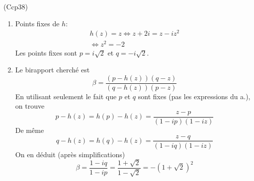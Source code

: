\begin{tiny}(Ccp38)\end{tiny}
\begin{enumerate}
 \item Points fixes de $h$:
\begin{multline*}
 h(z)=z 
 \Leftrightarrow z+2i = z -iz^2\\
 \Leftrightarrow z^2 = -2
\end{multline*}
Les points fixes sont $p=i\sqrt{2}$ et $q=-i\sqrt{2}$.
 \item Le birapport cherché est
\begin{displaymath}
 \beta = \frac{(p-h(z))(q-z)}{(q-h(z))(p-z)}
\end{displaymath}
En utilisant seulement le fait que $p$ et $q$ sont fixes (pas les expressions du a.), on trouve
\begin{displaymath}
 p-h(z) = h(p)-h(z)
 =\frac{z-p}{(1-ip)(1-iz)}
\end{displaymath}
De même
\begin{displaymath}
 q-h(z) = h(q)-h(z)
 =\frac{z-q}{(1-iq)(1-iz)}
\end{displaymath}
On en déduit (après simplifications)
\begin{displaymath}
 \beta = \frac{1-iq}{1-ip} = \frac{1+\sqrt{2}}{1-\sqrt{2}} =-(1+\sqrt{2})^2
\end{displaymath}

\end{enumerate}
